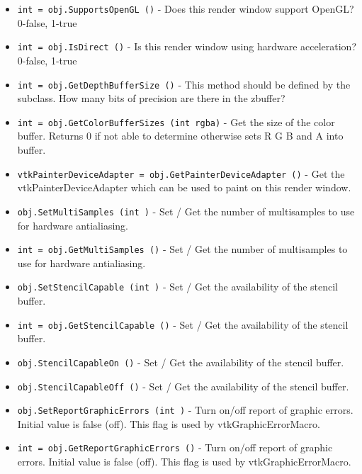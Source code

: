 \begin{itemize}
\item  \verb|int = obj.SupportsOpenGL ()| -  Does this render window support OpenGL? 0-false, 1-true

\item  \verb|int = obj.IsDirect ()| -  Is this render window using hardware acceleration? 0-false, 1-true

\item  \verb|int = obj.GetDepthBufferSize ()| -  This method should be defined by the subclass. How many bits of
 precision are there in the zbuffer?

\item  \verb|int = obj.GetColorBufferSizes (int rgba)| -  Get the size of the color buffer.
 Returns 0 if not able to determine otherwise sets R G B and A into buffer.

\item  \verb|vtkPainterDeviceAdapter = obj.GetPainterDeviceAdapter ()| -  Get the vtkPainterDeviceAdapter which can be used to paint on
 this render window.

\item  \verb|obj.SetMultiSamples (int )| -  Set / Get the number of multisamples to use for hardware antialiasing.

\item  \verb|int = obj.GetMultiSamples ()| -  Set / Get the number of multisamples to use for hardware antialiasing.

\item  \verb|obj.SetStencilCapable (int )| -  Set / Get the availability of the stencil buffer.

\item  \verb|int = obj.GetStencilCapable ()| -  Set / Get the availability of the stencil buffer.

\item  \verb|obj.StencilCapableOn ()| -  Set / Get the availability of the stencil buffer.

\item  \verb|obj.StencilCapableOff ()| -  Set / Get the availability of the stencil buffer.

\item  \verb|obj.SetReportGraphicErrors (int )| -  Turn on/off report of graphic errors. Initial value is false (off).
 This flag is used by vtkGraphicErrorMacro.

\item  \verb|int = obj.GetReportGraphicErrors ()| -  Turn on/off report of graphic errors. Initial value is false (off).
 This flag is used by vtkGraphicErrorMacro.


\end{itemize}

